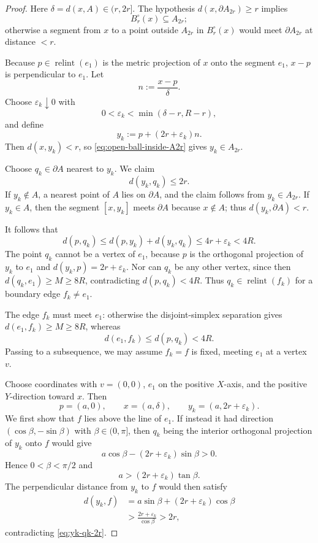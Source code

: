 \documentclass[11pt]{article}
\newcommand{\relint}{\operatorname{relint}}
\newcommand{\eps}{\varepsilon}
\numberwithin{equation}{section}
\begin{document}
\begin{proof}
Here $\delta=d(x,A)\in(r,2r]$. The hypothesis $d(x,\partial A_{2r})\ge r$ implies
\begin{equation}\label{eq:open-ball-inside-A2r}
B_r^\circ(x)\subseteq A_{2r};
\end{equation}
otherwise a segment from $x$ to a point outside $A_{2r}$ in $B_r^\circ(x)$ would meet $\partial A_{2r}$ at distance $<r$.

Because $p\in\relint(e_1)$ is the metric projection of $x$ onto the segment $e_1$, $x-p$ is perpendicular to $e_1$. Let
\[
n:=\frac{x-p}{\delta}.
\]
Choose $\eps_k\downarrow0$ with
\[
0<\eps_k<\min(\delta-r,R-r),
\]
and define
\[
y_k:=p+(2r+\eps_k)n.
\]
Then $d(x,y_k)<r$, so \eqref{eq:open-ball-inside-A2r} gives $y_k\in A_{2r}$.

Choose $q_k\in\partial A$ nearest to $y_k$. We claim
\begin{equation}\label{eq:yk-qk-2r}
d(y_k,q_k)\le2r.
\end{equation}
If $y_k\notin A$, a nearest point of $A$ lies on $\partial A$, and the claim follows from $y_k\in A_{2r}$. If $y_k\in A$, then the segment $[x,y_k]$ meets $\partial A$ because $x\notin A$; thus $d(y_k,\partial A)<r$.

It follows that
\[
d(p,q_k)\le d(p,y_k)+d(y_k,q_k)\le4r+\eps_k<4R.
\]
The point $q_k$ cannot be a vertex of $e_1$, because $p$ is the orthogonal projection of $y_k$ to $e_1$ and $d(y_k,p)=2r+\eps_k$. Nor can $q_k$ be any other vertex, since then $d(q_k,e_1)\ge M\ge8R$, contradicting $d(p,q_k)<4R$. Thus $q_k\in\relint(f_k)$ for a boundary edge $f_k\ne e_1$.

The edge $f_k$ must meet $e_1$: otherwise the disjoint-simplex separation gives $d(e_1,f_k)\ge M\ge8R$, whereas
\[
d(e_1,f_k)\le d(p,q_k)<4R.
\]
Passing to a subsequence, we may assume $f_k=f$ is fixed, meeting $e_1$ at a vertex $v$.

Choose coordinates with $v=(0,0)$, $e_1$ on the positive $X$-axis, and the positive $Y$-direction toward $x$. Then
\[
p=(a,0),
\qquad x=(a,\delta),
\qquad y_k=(a,2r+\eps_k).
\]
We first show that $f$ lies above the line of $e_1$. If instead it had direction $(\cos\beta,-\sin\beta)$ with $\beta\in(0,\pi]$, then $q_k$ being the interior orthogonal projection of $y_k$ onto $f$ would give
\[
a\cos\beta-(2r+\eps_k)\sin\beta>0.
\]
Hence $0<\beta<\pi/2$ and
\[
a>(2r+\eps_k)\tan\beta.
\]
The perpendicular distance from $y_k$ to $f$ would then satisfy
\[
\begin{aligned}
d(y_k,f)
&=a\sin\beta+(2r+\eps_k)\cos\beta\\
&>\frac{2r+\eps_k}{\cos\beta}>2r,
\end{aligned}
\]
contradicting \eqref{eq:yk-qk-2r}.


\end{proof}
\end{document}
